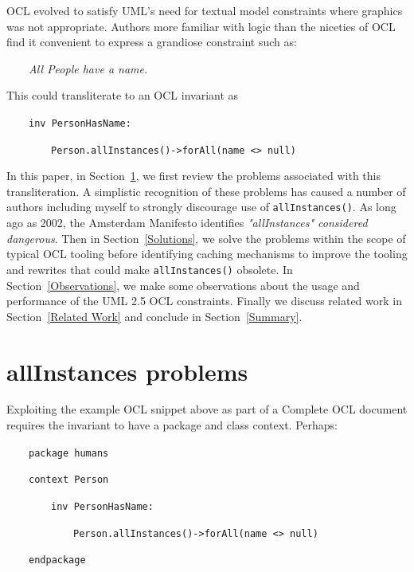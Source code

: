\documentclass[
]{ceurart}
\begin{document}
OCL \cite{OCL-2.4} evolved to satisfy UML's \cite{UML-2.5} need for textual model constraints where graphics was not appropriate. Authors more familiar with logic than the niceties of OCL find it convenient to express a grandiose constraint such as:

\begin{description}[itemsep=-0.2cm]\small
\item ~~~~\textit{All People have a name.}
\end{description}

This could transliterate to an OCL invariant as

\begin{description}[itemsep=-0.2cm]\small
\item ~~~~\verb!inv PersonHasName:!
\item ~~~~~~~~\verb!Person.allInstances()->forAll(name <> null)!
\end{description}

In this paper, in Section~\ref{Problems}, we first review the problems associated with this transliteration. A simplistic recognition of these problems has caused a number of authors including myself \cite{edwBadAllInstances} to strongly discourage use of \verb!allInstances()!. As long ago as 2002, the Amsterdam Manifesto \cite{cook2002amsterdam} identifies \textit{"allInstances" considered dangerous}. Then in Section~\ref{Solutions}, we solve the problems within the scope of typical OCL tooling before identifying caching mechanisms to improve the tooling and rewrites that could make \verb!allInstances()! obsolete. In Section~\ref{Observations}, we make some observations about the usage and performance of the UML 2.5 OCL constraints. Finally we discuss related work in Section~\ref{Related Work} and conclude in Section~\ref{Summary}.

\section{allInstances problems}\label{Problems}

Exploiting the example OCL snippet above as part of a Complete OCL document requires the invariant to have a package and class context. Perhaps:

\begin{description}[itemsep=-0.2cm]\small
\item ~~~~\verb!package humans!
\item ~~~~\verb!context Person!
\item ~~~~~~~~\verb!inv PersonHasName:!
\item ~~~~~~~~~~~~\verb!Person.allInstances()->forAll(name <> null)!
\item ~~~~\verb!endpackage!
\end{description}
\end{document}
